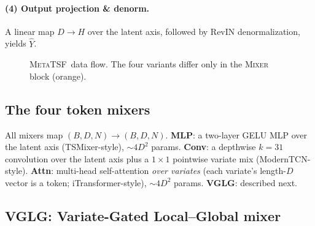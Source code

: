 \documentclass[11pt]{article}
\newcommand{\mtsf}{\textsc{MetaTSF}}
\newcommand{\vglg}{\textsc{VGLG}}
\begin{document}
\paragraph{(4) Output projection \& denorm.} A linear map $D\!\to\!H$ over the
latent axis, followed by RevIN denormalization, yields $\hat Y$.

\begin{figure}[t]
\centering
{}
\caption{\mtsf\ data flow. The four variants differ only in the
\textsc{Mixer} block (orange).}
\label{fig:arch}
\end{figure}

\subsection{The four token mixers}

All mixers map $(B,D,N)\!\to\!(B,D,N)$. \textbf{MLP}: a two-layer GELU MLP over the
latent axis (TSMixer-style), $\sim\!4D^2$ params. \textbf{Conv}: a depthwise
$k{=}31$ convolution over the latent axis plus a $1\times1$ pointwise variate mix
(ModernTCN-style). \textbf{Attn}: multi-head self-attention \emph{over variates}
(each variate's length-$D$ vector is a token; iTransformer-style), $\sim\!4D^2$
params. \textbf{\vglg}: described next.

\subsection{\vglg: Variate-Gated Local--Global mixer}
\end{document}
